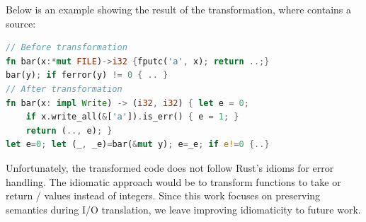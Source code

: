 Below is an example showing the result of the transformation, where 
contains a source:

\begin{lstlisting}[language=Rust]
// Before transformation
fn bar(x:*mut FILE)->i32 {fputc('a', x); return ..;}
bar(y); if ferror(y) != 0 { .. }
// After transformation
fn bar(x: impl Write) -> (i32, i32) { let e = 0;
    if x.write_all(&['a']).is_err() { e = 1; }
    return (.., e); }
let e=0; let (_, _e)=bar(&mut y); e=_e; if e!=0 {..}
\end{lstlisting}

Unfortunately, the transformed code does not follow Rust's idioms for error
handling.
%
The idiomatic approach would be to transform functions to take or return
/ values instead of integers.
%
Since this work focuses on preserving semantics during I/O translation, we leave
improving idiomaticity to future work.

